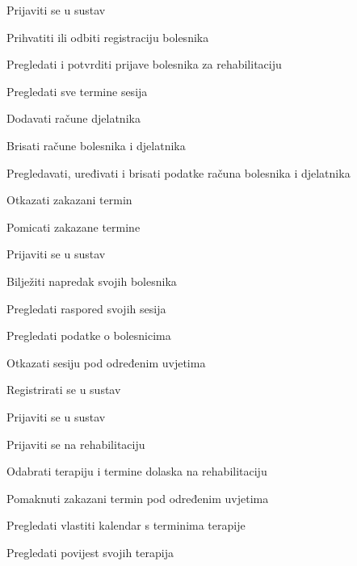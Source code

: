 \begin{packed_enum}
	\item  {}

	\begin{packed_enum}

        \item Prijaviti se u sustav 
	\item Prihvatiti ili odbiti registraciju bolesnika
        \item Pregledati i potvrditi prijave bolesnika za rehabilitaciju
        \item Pregledati sve termine sesija
        \item Dodavati račune djelatnika
        \item Brisati račune bolesnika i djelatnika
        \item Pregledavati, uređivati i brisati podatke računa bolesnika i djelatnika
        \item Otkazati zakazani termin 
        \item Pomicati zakazane termine 

	\end{packed_enum}

	\item  {}

	\begin{packed_enum}

        	\item Prijaviti se u sustav 
		\item Bilježiti napredak svojih bolesnika
		\item Pregledati raspored svojih sesija
		\item Pregledati podatke o bolesnicima
		\item Otkazati sesiju pod određenim uvjetima

	\end{packed_enum}

	\item {}

	\begin{packed_enum}

		\item Registrirati se u sustav
        	\item Prijaviti se u sustav 
		\item Prijaviti se na rehabilitaciju
		\item Odabrati terapiju i termine dolaska na rehabilitaciju
		\item Pomaknuti zakazani termin pod određenim uvjetima
		\item Pregledati vlastiti kalendar s terminima terapije
		\item Pregledati povijest svojih terapija 
  


\end{packed_enum}
\end{packed_enum}
